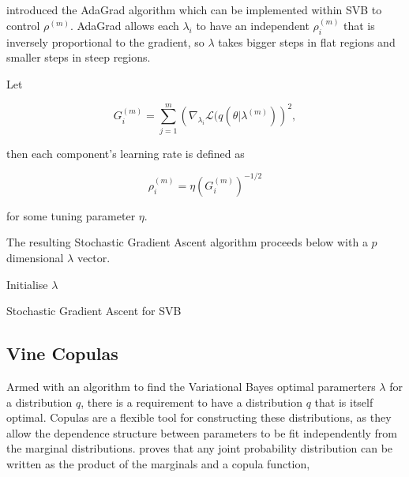\documentclass[12pt,a4paper]{article}%
\numberwithin{equation}{section}
\begin{document}
\citet{Duchi2011} introduced the AdaGrad algorithm which can be implemented within SVB to control $\rho^{(m)}$. AdaGrad allows each $\lambda_i$ to have an independent $\rho^{(m)}_i$ that is inversely proportional to the gradient, so $\lambda$ takes bigger steps in flat regions and smaller steps in steep regions. 

Let 

\begin{equation}
\label{SGA3}
G_i^{(m)} = \sum_{j = 1}^{m} \left(\nabla_{\lambda_i}\mathcal{L}(q(\theta | \lambda^{(m)})\right)^2,
\end{equation}

then each component's learning rate is defined as

\begin{equation}
\label{SGA4}
\rho^{(m)}_i = \eta \left(G_i^{(m)}\right)^{-1/2}
\end{equation}

for some tuning parameter $\eta$.

The resulting Stochastic Gradient Ascent algorithm proceeds below with a $p$ dimensional $\lambda$ vector.

\begin{algorithm}[H]
 Initialise $\lambda$\;
 \caption{Stochastic Gradient Ascent for SVB}
  \label{alg:algorithm2}
\end{algorithm}


\subsection{Vine Copulas}

Armed with an algorithm to find the Variational Bayes optimal paramerters $\lambda$ for a distribution $q$, there is a requirement to have a distribution $q$ that is itself optimal. Copulas are a flexible tool for constructing these distributions, as they allow the dependence structure between parameters to be fit independently from the marginal distributions. \citet{Sklar1959} proves that any joint probability distribution can be written as the product of the marginals and a copula function,
\end{document}
